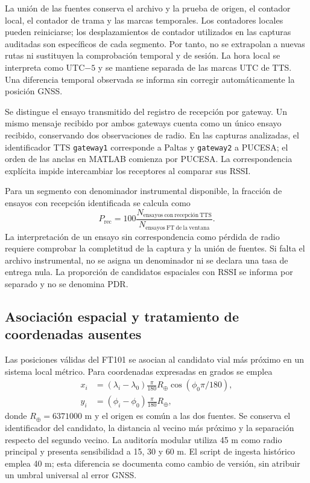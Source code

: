 La unión de las fuentes conserva el archivo y la prueba de origen, el contador local, el contador de trama y las marcas temporales. Los contadores locales pueden reiniciarse; los desplazamientos de contador utilizados en las capturas auditadas son específicos de cada segmento. Por tanto, no se extrapolan a nuevas rutas ni sustituyen la comprobación temporal y de sesión. La hora local se interpreta como UTC$-5$ y se mantiene separada de las marcas UTC de TTS. Una diferencia temporal observada se informa sin corregir automáticamente la posición GNSS.

Se distingue el ensayo transmitido del registro de recepción por gateway. Un mismo mensaje recibido por ambos gateways cuenta como un único ensayo recibido, conservando dos observaciones de radio. En las capturas analizadas, el identificador TTS \texttt{gateway1} corresponde a Paltas y \texttt{gateway2} a PUCESA; el orden de las anclas en MATLAB comienza por PUCESA. La correspondencia explícita impide intercambiar los receptores al comparar sus RSSI.

Para un segmento con denominador instrumental disponible, la fracción de ensayos con recepción identificada se calcula como
\begin{equation}
 P_{\mathrm{rec}}=100\frac{N_{\mathrm{ensayos\ con\ recepción\ TTS}}}
 {N_{\mathrm{ensayos\ FT\ de\ la\ ventana}}}.
\end{equation}
La interpretación de un ensayo sin correspondencia como pérdida de radio requiere comprobar la completitud de la captura y la unión de fuentes. Si falta el archivo instrumental, no se asigna un denominador ni se declara una tasa de entrega nula. La proporción de candidatos espaciales con RSSI se informa por separado y no se denomina PDR.

\subsection{Asociación espacial y tratamiento de coordenadas ausentes}

Las posiciones válidas del FT101 se asocian al candidato vial más próximo en un sistema local métrico. Para coordenadas expresadas en grados se emplea
\begin{align}
 x_i&=(\lambda_i-\lambda_0)\frac{\pi}{180}R_\oplus
       \cos(\phi_0\pi/180),\\
 y_i&=(\phi_i-\phi_0)\frac{\pi}{180}R_\oplus,
\end{align}
donde $R_\oplus=6371000$ m y el origen es común a las dos fuentes. Se conserva el identificador del candidato, la distancia al vecino más próximo y la separación respecto del segundo vecino. La auditoría modular utiliza 45 m como radio principal y presenta sensibilidad a 15, 30 y 60 m. El script de ingesta histórico emplea 40 m; esta diferencia se documenta como cambio de versión, sin atribuir un umbral universal al error GNSS.

